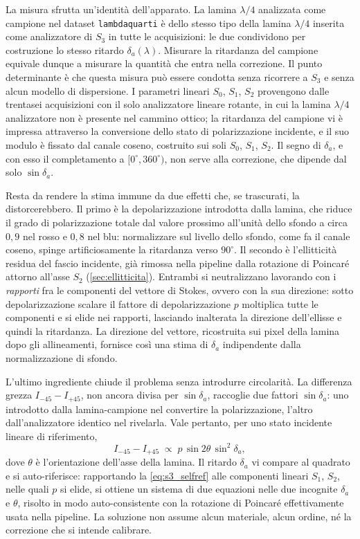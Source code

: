 La misura sfrutta un'identità dell'apparato. La lamina $\lambda/4$ analizzata come campione nel dataset \texttt{lambdaquarti} è dello stesso tipo della lamina $\lambda/4$ inserita come analizzatore di $S_3$ in tutte le acquisizioni: le due condividono per costruzione lo stesso ritardo $\delta_a(\lambda)$. Misurare la ritardanza del campione equivale dunque a misurare la quantità che entra nella correzione. Il punto determinante è che questa misura può essere condotta senza ricorrere a $S_3$ e senza alcun modello di dispersione. I parametri lineari $S_0$, $S_1$, $S_2$ provengono dalle trentasei acquisizioni con il solo analizzatore lineare rotante, in cui la lamina $\lambda/4$ analizzatore non è presente nel cammino ottico; la ritardanza del campione vi è impressa attraverso la conversione dello stato di polarizzazione incidente, e il suo modulo è fissato dal canale coseno, costruito sui soli $S_0$, $S_1$, $S_2$. Il segno di $\delta_a$, e con esso il completamento a $[0^\circ, 360^\circ)$, non serve alla correzione, che dipende dal solo $\sin\delta_a$.

Resta da rendere la stima immune da due effetti che, se trascurati, la distorcerebbero. Il primo è la depolarizzazione introdotta dalla lamina, che riduce il grado di polarizzazione totale dal valore prossimo all'unità dello sfondo a circa $0{,}9$ nel rosso e $0{,}8$ nel blu: normalizzare sul livello dello sfondo, come fa il canale coseno, spinge artificiosamente la ritardanza verso $90^\circ$. Il secondo è l'ellitticità residua del fascio incidente, già rimossa nella pipeline dalla rotazione di Poincaré attorno all'asse $S_2$ (\cref{sec:ellitticita}). Entrambi si neutralizzano lavorando con i \emph{rapporti} fra le componenti del vettore di Stokes, ovvero con la sua direzione: sotto depolarizzazione scalare il fattore di depolarizzazione $p$ moltiplica tutte le componenti e si elide nei rapporti, lasciando inalterata la direzione dell'ellisse e quindi la ritardanza. La direzione del vettore, ricostruita sui pixel della lamina dopo gli allineamenti, fornisce così una stima di $\delta_a$ indipendente dalla normalizzazione di sfondo.

L'ultimo ingrediente chiude il problema senza introdurre circolarità. La differenza grezza $I_{-45} - I_{+45}$, non ancora divisa per $\sin\delta_a$, raccoglie due fattori $\sin\delta_a$: uno introdotto dalla lamina-campione nel convertire la polarizzazione, l'altro dall'analizzatore identico nel rivelarla. Vale pertanto, per uno stato incidente lineare di riferimento,
\begin{equation}
    I_{-45} - I_{+45} \;\propto\; p \, \sin 2\theta \, \sin^2\!\delta_a,
    \label{eq:s3_selfref}
\end{equation}
dove $\theta$ è l'orientazione dell'asse della lamina. Il ritardo $\delta_a$ vi compare al quadrato e si auto-riferisce: rapportando la \cref{eq:s3_selfref} alle componenti lineari $S_1$, $S_2$, nelle quali $p$ si elide, si ottiene un sistema di due equazioni nelle due incognite $\delta_a$ e $\theta$, risolto in modo auto-consistente con la rotazione di Poincaré effettivamente usata nella pipeline. La soluzione non assume alcun materiale, alcun ordine, né la correzione che si intende calibrare.

